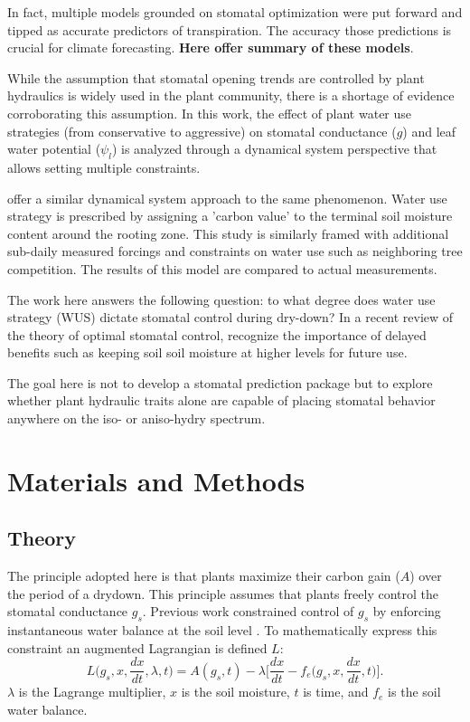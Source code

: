 \documentclass[utf8]{frontiersSCNS} %
\begin{document}
In fact, multiple models grounded on stomatal optimization were put forward and tipped as accurate predictors of transpiration. The accuracy those predictions is crucial for climate forecasting. \textbf{Here offer summary of these models}.

While the assumption that stomatal opening trends are controlled by plant hydraulics is widely used in the plant community, there is a shortage of evidence corroborating this assumption. In this work, the effect of plant water use strategies (from conservative to aggressive) on stomatal conductance ($g$) and leaf water potential ($\psi_l$) is analyzed through a dynamical system perspective that allows setting multiple constraints. 

\citet{Manzoni2013} offer a similar dynamical system approach to the same phenomenon. Water use strategy is prescribed by assigning a 'carbon value' to the terminal soil moisture content around the rooting zone. This study is similarly framed with additional sub-daily measured forcings and constraints on water use such as neighboring tree competition. The results of this model are compared to actual measurements.

The work here answers the following question: to what degree does water use strategy (WUS) dictate stomatal control during dry-down? In a recent review of the theory of optimal stomatal control, \citet{Buckley2017} recognize the importance of delayed benefits such as keeping soil soil moisture at higher levels for future use. 

The goal here is not to develop a stomatal prediction package but to explore whether plant hydraulic traits alone are capable of placing stomatal behavior anywhere on the iso- or aniso-hydry spectrum. 

\section{Materials and Methods}

\subsection{Theory}

The principle adopted here is that plants maximize their carbon gain ($A$) over the period of a drydown. This principle assumes that plants freely control the stomatal conductance $g_s$. Previous work constrained control of $g_s$ by enforcing instantaneous water balance at the soil level \citep{Manzoni2013}. To mathematically express this constraint an augmented Lagrangian is defined $L$:
\begin{equation}
    \label{eqn:Lagrangian}
    L\Big(g_s, x, \frac{dx}{dt}, \lambda, t\Big) = A(g_s, t) - \lambda \Bigg[ \frac{dx}{dt} - f_e\Big(g_s, x, \frac{dx}{dt}, t\Big)\Bigg].
\end{equation}
$\lambda$ is the Lagrange multiplier, $x$ is the soil moisture, $t$ is time, and $f_e$ is the soil water balance.
\end{document}
